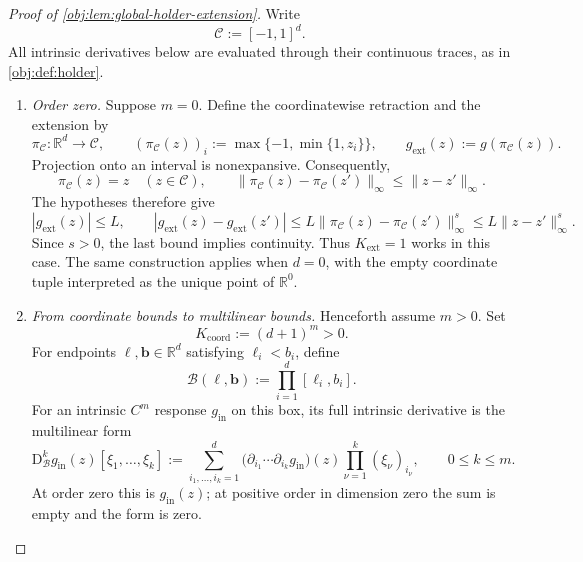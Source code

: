 \documentclass[11pt]{article}
\begin{document}
\begin{proof}[Proof of \cref{obj:lem:global-holder-extension}]
Write
\[
\mathcal C:=[-1,1]^d.
\]
All intrinsic derivatives below are evaluated through their continuous traces, as in \cref{obj:def:holder}.

\begin{enumerate}
\item \emph{Order zero.}
Suppose \(m=0\). Define the coordinatewise retraction and the extension by
\[
\pi_{\mathcal C}:\mathbb R^d\longrightarrow\mathcal C,
\qquad
(\pi_{\mathcal C}(z))_i:=\max\{-1,\min\{1,z_i\}\},
\qquad
g_{\mathrm{ext}}(z):=g(\pi_{\mathcal C}(z)).
\]
Projection onto an interval is nonexpansive. Consequently,
\[
\pi_{\mathcal C}(z)=z\quad(z\in\mathcal C),
\qquad
\|\pi_{\mathcal C}(z)-\pi_{\mathcal C}(z')\|_\infty
\le \|z-z'\|_\infty.
\]
The hypotheses therefore give
\[
|g_{\mathrm{ext}}(z)|\le L,
\qquad
|g_{\mathrm{ext}}(z)-g_{\mathrm{ext}}(z')|
\le L\|\pi_{\mathcal C}(z)-\pi_{\mathcal C}(z')\|_\infty^s
\le L\|z-z'\|_\infty^s.
\]
Since \(s>0\), the last bound implies continuity. Thus \(K_{\mathrm{ext}}=1\) works in this case. The same construction applies when \(d=0\), with the empty coordinate tuple interpreted as the unique point of \(\mathbb R^0\).

\item\label{proof:global-holder-extension:coordinate-bounds} \emph{From coordinate bounds to multilinear bounds.}
Henceforth assume \(m>0\). Set
\[
K_{\mathrm{coord}}:=(d+1)^m>0.
\]
For endpoints \(\boldsymbol\ell,\boldsymbol b\in\mathbb R^d\) satisfying
\(\ell_i<b_i\), define
\[
\mathcal B(\boldsymbol\ell,\boldsymbol b)
:=\prod_{i=1}^d[\ell_i,b_i].
\]
For an intrinsic \(C^m\) response \(g_{\mathrm{in}}\) on this box, its full intrinsic derivative is the multilinear form
\[
\mathrm D_{\mathcal B}^{k}g_{\mathrm{in}}(z)
[\xi_1,\ldots,\xi_k]
:=
\sum_{i_1,\ldots,i_k=1}^d
\bigl(\partial_{i_1}\cdots\partial_{i_k}g_{\mathrm{in}}\bigr)(z)
\prod_{\nu=1}^k(\xi_\nu)_{i_\nu},
\qquad 0\le k\le m.
\]
At order zero this is \(g_{\mathrm{in}}(z)\); at positive order in dimension zero the sum is empty and the form is zero.


\end{enumerate}
\end{proof}
\end{document}
